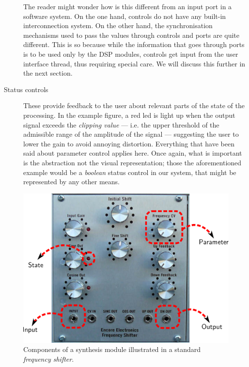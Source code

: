 \begin{description}
  The reader might wonder how is this different from an input port in
  a software system. On the one hand, controls do not have any
  built-in interconnection system. On the other hand, the
  synchronisation mechanisms used to pass the values through controls
  and ports are quite different. This is so because while the
  information that goes through ports is to be used only by the DSP
  modules, controls get input from the user interface thread, thus
  requiring special care. We will discuss this further in the next
  section.

\item[Status controls] These provide feedback to the user about
  relevant parts of the state of the processing. In the example
  figure, a red led is light up when the output signal exceeds the
  \emph{clipping value} --- i.e. the upper threshold of the admissible
  range of the amplitude of the signal --- suggesting the user to
  lower the gain to avoid annoying distortion. Everything that have
  been said about parameter control applies here. Once again, what is
  important is the abstraction not the visual representation; those
  the aforementioned example would be a \emph{boolean} status control in our
  system, that might be represented by any other means.
\end{description}

\begin{figure}
  \centering
  \includegraphics[width=.9\textwidth]{pic/hwmod.pdf}
  \caption{Components of a synthesis module illustrated in a standard
    \emph{frequency shifter}.}
  \label{fig:hwmod}
\end{figure}

